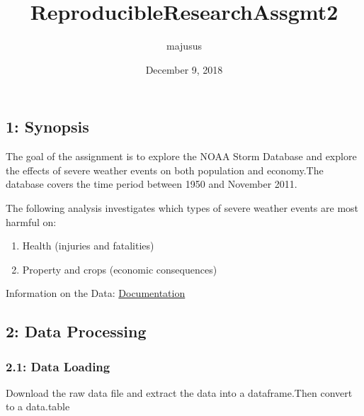 \documentclass[]{article}
\title{ReproducibleResearchAssgmt2}
\author{majusus}
\date{December 9, 2018}
\newenvironment{Shaded}{\begin{snugshade}}{\end{snugshade}}
\newcommand{\KeywordTok}[1]{\textcolor[rgb]{0.13,0.29,0.53}{\textbf{#1}}}
\newcommand{\DataTypeTok}[1]{\textcolor[rgb]{0.13,0.29,0.53}{#1}}
\newcommand{\StringTok}[1]{\textcolor[rgb]{0.31,0.60,0.02}{#1}}
\newcommand{\CommentTok}[1]{\textcolor[rgb]{0.56,0.35,0.01}{\textit{#1}}}
\newcommand{\NormalTok}[1]{#1}
\providecommand{\tightlist}{%
  \setlength{\itemsep}{0pt}\setlength{\parskip}{0pt}}
\begin{document}
\maketitle

\subsection{1: Synopsis}\label{synopsis}

The goal of the assignment is to explore the NOAA Storm Database and
explore the effects of severe weather events on both population and
economy.The database covers the time period between 1950 and November
2011.

The following analysis investigates which types of severe weather events
are most harmful on:

\begin{enumerate}
\def\labelenumi{\arabic{enumi}.}
\tightlist
\item
  Health (injuries and fatalities)
\item
  Property and crops (economic consequences)
\end{enumerate}

Information on the Data:
\href{https://d396qusza40orc.cloudfront.net/repdata\%2Fpeer2_doc\%2Fpd01016005curr.pdf}{Documentation}

\subsection{2: Data Processing}\label{data-processing}

\subsubsection{2.1: Data Loading}\label{data-loading}

Download the raw data file and extract the data into a dataframe.Then
convert to a data.table

\begin{Shaded}
\end{Shaded}
\end{document}
